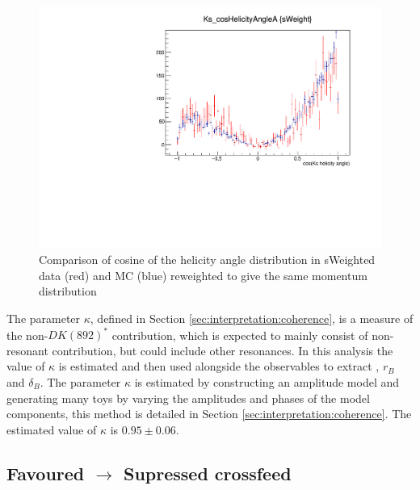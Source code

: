 \begin{figure}[h]
\centering
\includegraphics[width=0.6\linewidth]{figures/backgrounds/KsHelicityAngle_sweighted_MCweighted.pdf}
\caption{Comparison of cosine of the helicity angle distribution in sWeighted data (red) and MC (blue) reweighted to give the same \KS momentum distribution}
\label{kshelicitycomparisonreweighted}
\end{figure}

The parameter $\kappa$, defined in Section \ref{sec:interpretation:coherence}, is a measure of the non-$DK(892)^*$ contribution, which is expected to mainly consist of non-resonant contribution, but could include other resonances. In this analysis the value of $\kappa$ is estimated and then used alongside the \CP observables to extract \Pgamma, $r_B$ and $\delta_B$. The parameter $\kappa$ is estimated by constructing an amplitude model and generating many toys by varying the amplitudes and phases of the model components, this method is detailed in Section \ref{sec:interpretation:coherence}. The estimated value of $\kappa$ is $0.95 \pm 0.06$.

\subsection{Favoured $\to$ Supressed crossfeed}
\label{sec:backgrounds:crossfeed}

